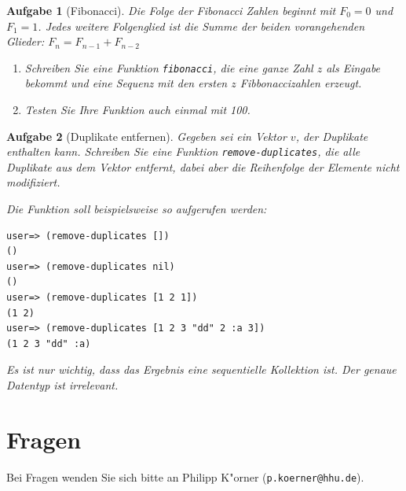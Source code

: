 \documentclass[11pt,a4paper]{article}
\newcounter{numb}
\theoremstyle{break}
\newtheorem{aufgabe}{Aufgabe}[numb]
\begin{document}
\begin{aufgabe}[Fibonacci]
Die Folge der Fibonacci Zahlen beginnt mit $F_0=0$ und $F_1=1$. Jedes weitere Folgenglied ist die Summe der beiden vorangehenden Glieder: $F_{n}=F_{n-1}+F_{n-2}$ 
\begin{enumerate}[label=\alph*)]
  \item Schreiben Sie eine Funktion \verb|fibonacci|, die eine ganze  Zahl $z$ als Eingabe bekommt und eine Sequenz mit den ersten $z$ Fibbonaccizahlen erzeugt.
  \item Testen Sie Ihre Funktion auch einmal mit 100.
  \end{enumerate}
\end{aufgabe}






\begin{aufgabe}[Duplikate entfernen]
Gegeben sei ein Vektor $v$, der Duplikate enthalten kann. Schreiben Sie eine Funktion \texttt{remove-duplicates}, die alle Duplikate aus dem Vektor entfernt, dabei aber die Reihenfolge der Elemente nicht modifiziert. 

Die Funktion soll beispielsweise so aufgerufen werden:
\begin{verbatim}
user=> (remove-duplicates [])
()
user=> (remove-duplicates nil)
()
user=> (remove-duplicates [1 2 1])
(1 2)
user=> (remove-duplicates [1 2 3 "dd" 2 :a 3])
(1 2 3 "dd" :a)
\end{verbatim}

Es ist nur wichtig, dass das Ergebnis eine sequentielle Kollektion ist. Der genaue Datentyp ist irrelevant.
\end{aufgabe}


\section*{Fragen}
Bei Fragen wenden Sie sich bitte an Philipp K"orner (\texttt{p.koerner@hhu.de}).
\end{document}
